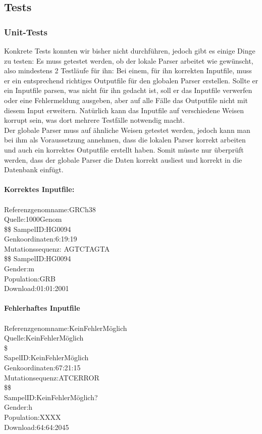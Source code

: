 \subsection{Tests}
\subsubsection{Unit-Tests}
Konkrete Tests konnten wir bisher nicht durchführen, jedoch gibt es einige Dinge zu testen: Es muss getestet werden, ob der lokale Parser arbeitet wie gewünscht, also mindestens 2 Testläufe für ihn: Bei einem, für ihn korrekten Inputfile, muss er ein entsprechend richtiges Outputfile für den globalen Parser erstellen. Sollte er ein Inputfile parsen, was nicht für ihn gedacht ist, soll er das Inputfile verwerfen oder eine Fehlermeldung ausgeben, aber auf alle Fälle das Outputfile nicht mit diesem Input erweitern. Natürlich kann das Inputfile auf verschiedene Weisen korrupt sein, was dort mehrere Testfälle notwendig macht.\\
Der globale Parser muss auf ähnliche Weisen getestet werden, jedoch kann man bei ihm als Voraussetzung annehmen, dass die lokalen Parser korrekt arbeiten und auch ein korrektes Outputfile erstellt haben. Somit müsste nur überprüft werden, dass der globale Parser die Daten korrekt ausliest und korrekt in die Datenbank einfügt.\\
\\
\textbf{Korrektes Inputfile:}\\
\\
Referenzgenomname:GRCh38\\
Quelle:1000Genom\\
\$\$
SampelID:HG0094\\
Genkoordinaten:6:19:19\\
Mutationssequenz: AGTCTAGTA\\
\$\$
SampelID:HG0094\\
Gender:m\\
Population:GRB\\
Download:01:01:2001\\
\\
\textbf{Fehlerhaftes Inputfile}\\
\\
Referenzgenomname:KeinFehlerMöglich\\
Quelle:KeinFehlerMöglich\\
\$\\
SapelID:KeinFehlerMöglich\\
Genkoordinaten:67:21:15\\
Mutationsequenz:ATCERROR\\
\$\$\\
SampelID:KeinFehlerMöglich?\\
Gender:h\\
Population:XXXX\\
Download:64:64:2045\\

